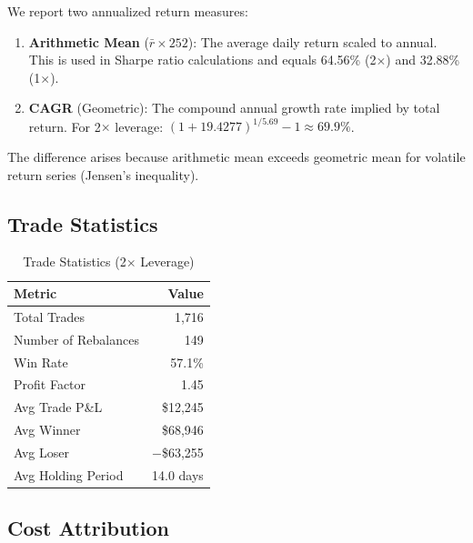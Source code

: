 \documentclass[12pt,a4paper]{article}
\theoremstyle{definition}
\begin{document}
We report two annualized return measures:

\begin{enumerate}
    \item \textbf{Arithmetic Mean} ($\bar{r} \times 252$): The average daily return scaled to annual. This is used in Sharpe ratio calculations and equals 64.56\% (2$\times$) and 32.88\% (1$\times$).

    \item \textbf{CAGR} (Geometric): The compound annual growth rate implied by total return. For 2$\times$ leverage: $(1 + 19.4277)^{1/5.69} - 1 \approx 69.9\%$.
\end{enumerate}

The difference arises because arithmetic mean exceeds geometric mean for volatile return series (Jensen's inequality).

\subsection{Trade Statistics}

\begin{table}[H]
\centering
\caption{Trade Statistics (2$\times$ Leverage)}
\label{tab:trade_stats}
\begin{tabular}{lr}
\toprule
\textbf{Metric} & \textbf{Value} \\
\midrule
Total Trades & 1,716 \\
Number of Rebalances & 149 \\
Win Rate & 57.1\% \\
Profit Factor & 1.45 \\
Avg Trade P\&L & \$12,245 \\
Avg Winner & \$68,946 \\
Avg Loser & $-$\$63,255 \\
Avg Holding Period & 14.0 days \\
\bottomrule
\end{tabular}
\end{table}

\subsection{Cost Attribution}
\end{document}
